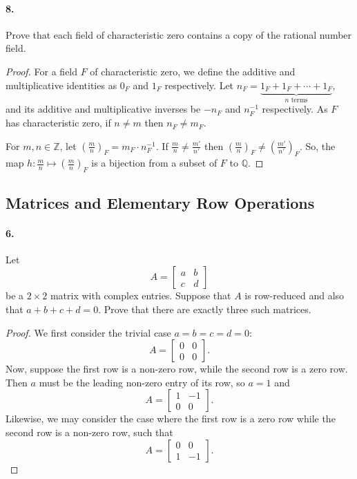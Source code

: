 \documentclass{article}
\begin{document}
\paragraph{8.} Prove that each field of characteristic zero contains a copy of
the rational number field.

\begin{proof}
  For a field $F$ of characteristic zero, we define the additive and
  multiplicative identities as $0_F$ and $1_F$ respectively. Let $n_F =
  \underbrace{1_F + 1_F + \cdots + 1_F}_{n\text{ terms}}$, and its additive and
  multiplicative inverses be $-n_F$ and $n_F^{-1}$ respectively. As $F$ has
  characteristic zero, if $n \neq m$ then $n_F \neq m_F$.

  For $m, n \in \mathbb{Z}$, let $\left(\frac{m}{n}\right)_F = m_F \cdot
  n_F^{-1}$. If $\frac{m}{n} \neq \frac{m'}{n'}$ then
  $\left(\frac{m}{n}\right)_F \neq \left(\frac{m'}{n'}\right)_F$. So, the map
  $h: \frac{m}{n} \mapsto \left(\frac{m}{n}\right)_F$ is a bijection from a
  subset of $F$ to $\mathbb{Q}$.
\end{proof}

\subsection{Matrices and Elementary Row Operations}

\paragraph{6.} Let \[
  A = \begin{bmatrix}
    a & b \\
    c & d
  \end{bmatrix}
\] be a $2 \times 2$ matrix with complex entries. Suppose that $A$ is
row-reduced and also that $a + b + c + d = 0$. Prove that there are exactly
three such matrices.

\begin{proof}
  We first consider the trivial case $a = b = c = d = 0$: \[
    A = \begin{bmatrix}
      0 & 0 \\
      0 & 0
    \end{bmatrix}.
  \] Now, suppose the first row is a non-zero row, while the second row is
  a zero row. Then $a$ must be the leading non-zero entry of its row, so $a = 1$
  and \[
    A = \begin{bmatrix}
      1 & -1 \\
      0 & 0
    \end{bmatrix}.
  \] Likewise, we may consider the case where the first row is a zero row while
  the second row is a non-zero row, such that \[
    A = \begin{bmatrix}
      0 & 0 \\
      1 & -1
    \end{bmatrix}.
  \]
\end{proof}
\end{document}
